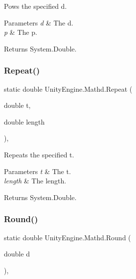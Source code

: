 Pows the specified d. 


\begin{DoxyParams}{Parameters}
{\em d} & The d.\\
\hline
{\em p} & The p.\\
\hline
\end{DoxyParams}
\begin{DoxyReturn}{Returns}
System.\+Double.
\end{DoxyReturn}
\mbox{\label{struct_unity_engine_1_1_mathd_a699d48b8c58b6b1b171a2d5bdc9f7ea0}} 
\subsubsection{\texorpdfstring{Repeat()}{Repeat()}}
{\footnotesize\ttfamily static double Unity\+Engine.\+Mathd.\+Repeat (\begin{DoxyParamCaption}\item[{double}]{t,  }\item[{double}]{length }\end{DoxyParamCaption})\hspace{0.3cm}{\ttfamily [inline]}, {\ttfamily [static]}}



Repeats the specified t. 


\begin{DoxyParams}{Parameters}
{\em t} & The t.\\
\hline
{\em length} & The length.\\
\hline
\end{DoxyParams}
\begin{DoxyReturn}{Returns}
System.\+Double.
\end{DoxyReturn}
\mbox{\label{struct_unity_engine_1_1_mathd_a65d6708eb7dfac9261028e11c8ad0e87}} 
\subsubsection{\texorpdfstring{Round()}{Round()}}
{\footnotesize\ttfamily static double Unity\+Engine.\+Mathd.\+Round (\begin{DoxyParamCaption}\item[{double}]{d }\end{DoxyParamCaption})\hspace{0.3cm}{\ttfamily [inline]}, {\ttfamily [static]}}



